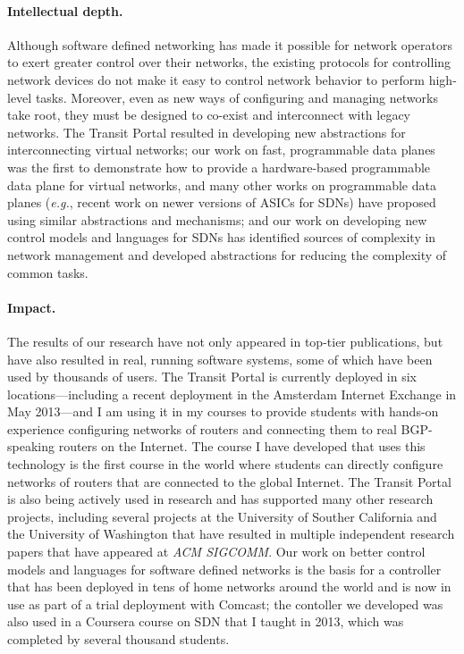 \documentclass{article}
\newcommand{\eg}{{\em e.g.}}
\begin{document}
\paragraph{Intellectual depth.}  Although software defined networking
has made it possible for network operators to exert greater control over
their networks, the existing protocols for controlling network devices
do not make it easy to control network behavior to perform high-level
tasks.  Moreover, even as new ways of configuring and managing networks
take root, they must be designed to co-exist and interconnect with
legacy networks.  The Transit Portal resulted in developing new
abstractions for interconnecting virtual networks; our work on fast,
programmable data planes was the first to demonstrate how to provide a
hardware-based programmable data plane for virtual networks, and many
other works on programmable data planes (\eg, recent work on newer
versions of ASICs for SDNs) have proposed using similar abstractions and
mechanisms; and our work on developing new control models and languages
for SDNs has identified sources of complexity in network management and
developed abstractions for reducing the complexity of common tasks.

\paragraph{Impact.}  
The results of our research have not only appeared in top-tier
publications, but have also resulted in real, running software systems,
some of which have been used by thousands of users.  The Transit Portal
is currently deployed in six locations---including a recent deployment
in the Amsterdam Internet Exchange in May 2013---and I am using it in my
courses to provide students with hands-on experience configuring
networks of routers and connecting them to real BGP-speaking routers on
the Internet.  The course I have developed that uses this technology is
the first course in the world where students can directly configure
networks of routers that are connected to the global Internet.  The
Transit Portal is also being actively used in research and has supported
many other research projects, including several projects at the
University of Souther California and the University of Washington that
have resulted in multiple independent research papers that have appeared
at {\em ACM SIGCOMM}.  Our work on better control models and languages
for software defined networks is the basis for a controller that has
been deployed in tens of home networks around the world and is now in
use as part of a trial deployment with Comcast; the contoller we
developed was also used in a Coursera course on SDN that I taught in
2013, which was completed by several thousand students.
\end{document}
